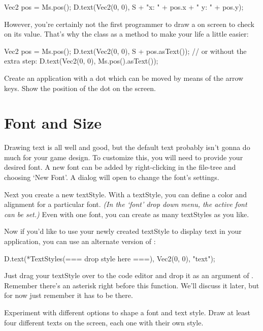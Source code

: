 \begin{code}
Vec2 pos = Ms.pos();
D.text(Vec2(0, 0), S + "x: " + pos.x + " y: " + pos.y);
\end{code}

However, you're certainly not the first programmer to draw a  on screen to check on its value. That's why the class as a method to make your life a little easier:

\begin{code}
Vec2 pos = Ms.pos();
D.text(Vec2(0, 0), S + pos.asText());
// or without the extra step:
D.text(Vec2(0, 0), Ms.pos().asText());
\end{code}

\begin{exercise}
Create an application with a dot which can be moved by means of the arrow keys. Show the position of the dot on the screen.
\end{exercise}

\section{Font and Size}
\label{chapter:tekstopmaak}
Drawing text is all well and good, but the default text probably isn't gonna do much for your game design. To customize this, you will need to provide your desired font. A new font can be added by right-clicking in the file-tree and choosing `New Font'. A dialog will open to change the font's settings.

Next you create a new textStyle. With a textStyle, you can define a color and alignment for a particular font. \textsl{(In the `font' drop down menu, the active font can be set.)} Even with one font, you can create as many textStyles as you like.

Now if you'd like to use your newly created textStyle to display text in your application, you can use an alternate version of  :

\begin{code}
D.text(*TextStyles(=== drop style here ===), Vec2(0, 0), "text");
\end{code}

Just drag your textStyle over to the code editor and drop it as an argument of . Remember there's an asterisk right before this function. We'll discuss it later, but for now just remember it has to be there.

\begin{exercise}
Experiment with different options to shape a font and text style. Draw at least four different texts on the screen, each one with their own style.
\end{exercise}